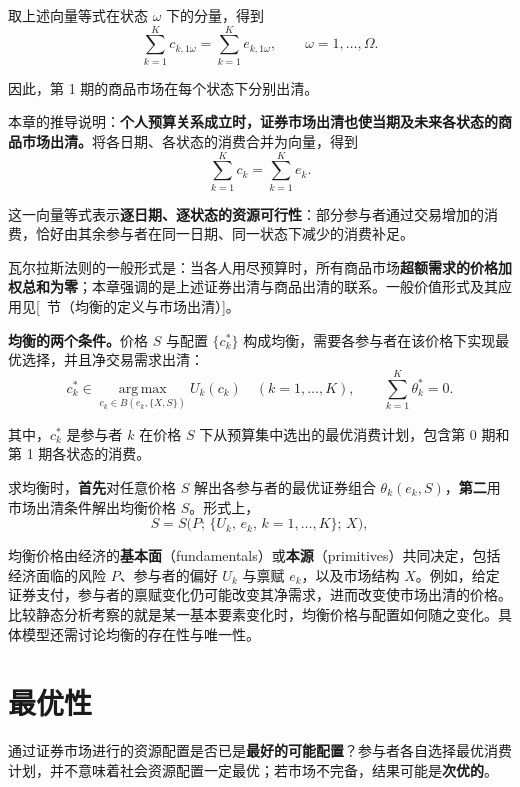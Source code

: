 取上述向量等式在状态 $\omega$ 下的分量，得到
\[
 \sum_{k=1}^{K}c_{k,1\omega}
 =\sum_{k=1}^{K}e_{k,1\omega},
 \qquad \omega=1,\ldots,\Omega.
\]

因此，第 1 期的商品市场在每个状态下分别出清。

\begin{tcolorbox}[knowledge,title=瓦尔拉斯法则：证券出清与商品出清]
本章的推导说明：\textbf{个人预算关系成立时，证券市场出清也使当期及未来各状态的商品市场出清。}将各日期、各状态的消费合并为向量，得到
\[
 \sum_{k=1}^{K}c_k=\sum_{k=1}^{K}e_k.
\]

这一向量等式表示\textbf{逐日期、逐状态的资源可行性}：部分参与者通过交易增加的消费，恰好由其余参与者在同一日期、同一状态下减少的消费补足。

瓦尔拉斯法则的一般形式是：当各人用尽预算时，所有商品市场\textbf{超额需求的价格加权总和为零}；本章强调的是上述证券出清与商品出清的联系。一般价值形式及其应用见[~节（均衡的定义与市场出清）]。
\end{tcolorbox}

\begin{tcolorbox}[knowledge]
\textbf{均衡的两个条件。}价格 $S$ 与配置 $\{c_k^*\}$ 构成均衡，需要各参与者在该价格下实现最优选择，并且净交易需求出清：
\[
 c_k^*\in\operatorname*{arg\,max}_{c_k\in B(e_k,\{X,S\})}U_k(c_k)
 \quad(k=1,\ldots,K),\qquad
 \sum_{k=1}^{K}\theta_k^*=0.
\]

其中，$c_k^*$ 是参与者 $k$ 在价格 $S$ 下从预算集中选出的最优消费计划，包含第 0 期和第 1 期各状态的消费。
\end{tcolorbox}

求均衡时，\textbf{首先}对任意价格 $S$ 解出各参与者的最优证券组合 $\theta_k(e_k,S)$，\textbf{第二}用市场出清条件解出均衡价格 $S$。形式上，
    \[
        S=S\bigl(P;\,\{U_k,\,e_k,\,k=1,\dots,K\};\,X\bigr),
    \]

均衡价格由经济的\textbf{基本面}（fundamentals）或\textbf{本源}（primitives）共同决定，包括经济面临的风险 $P$、参与者的偏好 $U_k$ 与禀赋 $e_k$，以及市场结构 $X$。例如，给定证券支付，参与者的禀赋变化仍可能改变其净需求，进而改变使市场出清的价格。比较静态分析考察的就是某一基本要素变化时，均衡价格与配置如何随之变化。具体模型还需讨论均衡的存在性与唯一性。


\section{最优性}

通过证券市场进行的资源配置是否已是\textbf{最好的可能配置}？参与者各自选择最优消费计划，并不意味着社会资源配置一定最优；若市场不完备，结果可能是\textbf{次优的}。

